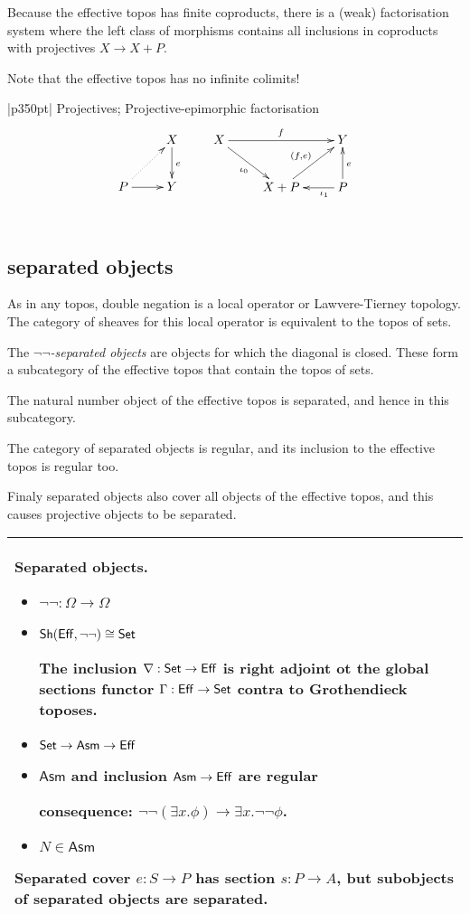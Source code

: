 \documentclass[12pt,a4paper]{article}
\theoremstyle{definition}
\newenvironment{blackboard}{\begin{tabular}{|p{350pt}|}\hline} {\\ \hline \end{tabular} }
\begin{document}
Because the effective topos has finite coproducts, there is a (weak) factorisation system where the left class of morphisms contains all inclusions in coproducts with projectives $X\to X+P$.

Note that the effective topos has no infinite colimits!

\begin{blackboard}
Projectives; Projective-epimorphic factorisation
\[ \xymatrix{
& X\ar[d]^e\\
P \ar@{.>}[ur]\ar[r] & Y
}\qquad\xymatrix{
X\ar[rr]^f\ar[dr]_{\iota_0} && Y \\
& X+P \ar[ur]^{(f,e)} & P\ar[u]_e\ar[l]^(.3){\iota_1}
}\]
\end{blackboard}

\subsection{separated objects}
As in any topos, double negation is a local operator or Lawvere-Tierney topology. The category of sheaves for this local operator is equivalent to the topos of sets. 

\newcommand\Asm{\mathsf{Asm}}
The \emph{$\neg\neg$-separated objects} are objects for which the diagonal is closed. These form a subcategory of the effective topos that contain the topos of sets.

The natural number object of the effective topos is separated, and hence in this subcategory.

The category of separated objects is regular, and its inclusion to the effective topos is regular too.

Finaly separated objects also cover all objects of the effective topos, and this causes projective objects to be separated.

\begin{blackboard}
Separated objects.
\begin{itemize}
\item $\neg\neg:\Omega \to \Omega$ 
\item $\mathsf{Sh}(\mathsf{Eff},\neg\neg)\cong\mathsf{Set}$

The inclusion $\nabla:\mathsf{Set} \to \mathsf{Eff}$ is right adjoint ot the global sections functor $\Gamma:\mathsf{Eff} \to \mathsf{Set}$ contra to Grothendieck toposes.

\item $\Set \to \Asm \to \Eff$
\item $\Asm$ and inclusion $\Asm\to \Eff$ are regular

consequence: $\neg\neg(\exists x.\phi)\to \exists x.\neg\neg\phi$.

\item $N\in \Asm$
\end{itemize}

Separated cover $e:S \to P$ has section $s:P\to A$, but subobjects of separated objects are separated.
\end{blackboard}
\end{document}

